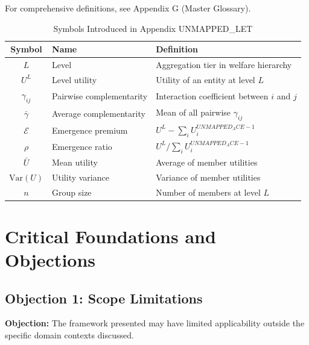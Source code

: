 For comprehensive definitions, see Appendix G (Master Glossary).

\label{sec:let-glossary}

\begin{table}[htbp]
\centering
\caption{Symbols Introduced in Appendix UNMAPPED_LET}
\label{tab:let-symbols}
\renewcommand{\arraystretch}{1.3}
\begin{tabular}{@{}clp{6cm}@{}}
\toprule
\textbf{Symbol} & \textbf{Name} & \textbf{Definition} \\
\midrule
$L$ & Level & Aggregation tier in welfare hierarchy \\
$U^L$ & Level utility & Utility of an entity at level $L$ \\
$\gamma_{ij}$ & Pairwise complementarity & Interaction coefficient between $i$ and $j$ \\
$\bar{\gamma}$ & Average complementarity & Mean of all pairwise $\gamma_{ij}$ \\
$\mathcal{E}$ & Emergence premium & $U^L - \sum_i U^{UNMAPPED_ACE-1}_i$ \\
$\rho$ & Emergence ratio & $U^L / \sum_i U^{UNMAPPED_ACE-1}_i$ \\
$\bar{U}$ & Mean utility & Average of member utilities \\
$\text{Var}(U)$ & Utility variance & Variance of member utilities \\
$n$ & Group size & Number of members at level $L$ \\
\bottomrule
\end{tabular}
\end{table}



\section{Critical Foundations and Objections}
\label{sec:let-foundations}

\subsection{Objection 1: Scope Limitations}

\textbf{Objection:} The framework presented may have limited applicability
outside the specific domain contexts discussed.

